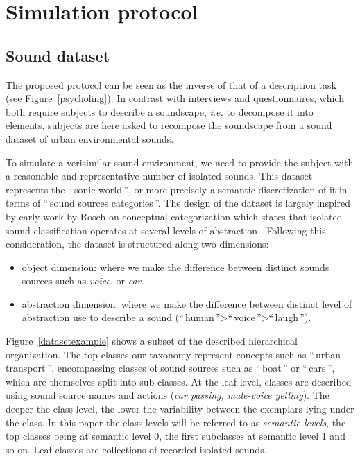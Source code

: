 \documentclass[twoside,twocolumn]{article}
\begin{document}

\section{Simulation protocol}

\subsection{Sound dataset}
\label{sec:SoundDataset}

The proposed protocol can be seen as the inverse of that of a description task (see Figure~\ref{psycholing}). In contrast with interviews and questionnaires, which both require subjects to describe a soundscape, \textit{i.e.} to decompose it into elements, subjects are here asked to recompose the soundscape from a sound dataset of urban environmental sounds.

To simulate a verisimilar sound environment, we need to provide the subject with a reasonable and representative number of isolated sounds. This dataset represents the ``\,sonic world\,'', or more precisely a semantic discretization of it in terms of  ``\,sound sources categories\,''. The design of the dataset is largely inspired by early work by Rosch \cite{roach1978cognition} on conceptual categorization which states that isolated sound classification operates at several levels of abstraction \cite{houix_lexical_2012}. Following this consideration, the dataset is structured along two dimensions:

\begin{itemize}
\item object dimension: where we make the difference between distinct sounds sources such as \textit{voice}, or \textit{car}. 
\item abstraction dimension: where we make the difference between distinct level of abstraction use to describe a sound (``\,human\,''>``\,voice\,''>``\,laugh\,''). 
\end{itemize}

Figure~\ref{datasetexample} shows a subset of the described hierarchical organization. The top classes our taxonomy represent concepts such as ``\,urban transport\,'', encompassing classes of sound sources such as ``\,boat\,'' or  ``\,cars\,'', which are themselves split into sub-classes. At the leaf level, classes are described using sound source names and actions (\textit{car passing, male-voice yelling}). The deeper the class level, the lower the variability between the exemplars lying under the class. In this paper the class levels will be referred to as \emph{semantic levels}, the top classes being at semantic level 0, the first subclasses at semantic level 1 and so on. Leaf classes are collections of recorded isolated sounds. 
\end{document}
